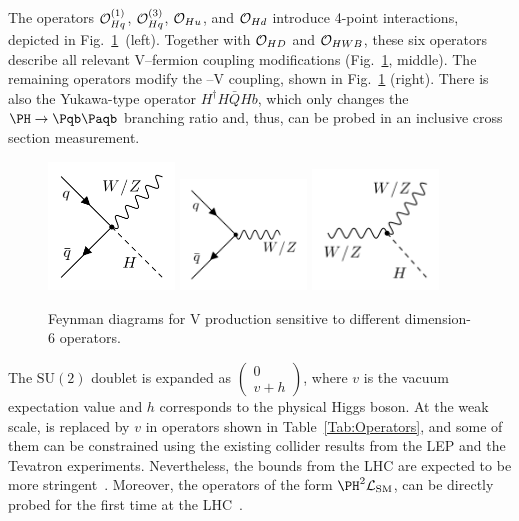 \documentclass[a4paper,11pt]{article}
\newcommand{\Pb}{{{\Pqb}}\xspace}
\newcommand{\PAb}{{{{\Paqb}}}\xspace}
\renewcommand{\PV}{{{{V}}}\xspace}
\newcommand{\VH}{{{\PV}{\PH}}\xspace}
\begin{document}
The operators ${\cal O}^{(1)}_{Hq}$, ${\cal O}^{(3)}_{Hq}$, ${\cal O}_{Hu}$, and ${\cal O}_{Hd}$ introduce 4-point interactions, depicted in Fig.~\ref{fig:Feynman_digarams}~(left). 
Together with ${\cal O}_{HD}$ and ${\cal O}_{HWB}$, these six operators describe all relevant {\PV}--fermion coupling modifications (Fig.~\ref{fig:Feynman_digarams}, middle). 
The remaining operators modify the \PH--\PV coupling, shown in Fig.~\ref{fig:Feynman_digarams} (right). 
There is also the Yukawa-type operator $H^\dagger H \bar{Q}H b$, which only changes the $\PH \to \Pb \PAb$ branching ratio and, thus, can be probed in an inclusive cross section measurement. 
\begin{figure}[hbtp]
\begin{center}
\includegraphics[width=0.3\textwidth]{Figures/New/LHE//qqVH.png}
\includegraphics[width=0.3\textwidth]{Figures/New/LHE//qqV.png}
\includegraphics[width=0.3\textwidth]{Figures/New/LHE//VVh.png}
\end{center}
\caption{
Feynman diagrams for \VH production sensitive to different dimension-6 operators.
}
\label{fig:Feynman_digarams}
\end{figure}
The $\textrm{SU}(2)$ doublet \PH is expanded as $\begin{pmatrix} 0 \\ v+h \end{pmatrix}$, where $v$ is the vacuum expectation value  and $h$ corresponds to the physical Higgs boson.
At the weak scale,  \PH is replaced by $v$ in operators shown in Table~\ref{Tab:Operators}, and some of them can be constrained using the existing collider results from  the LEP and the Tevatron experiments.
Nevertheless, the bounds from the LHC are expected to be more stringent~\cite{Ellis:2014jta,Grojean:2018dqj}.
Moreover, the operators of the form ${\PH}^2\mathcal{L}_{\text{SM}}$, can be directly probed for the first time at the LHC~\cite{Gupta:2014rxa}. 
\end{document}
